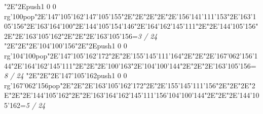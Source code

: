 \null\vfill\enskip\enskip\enskip\ipa\char"2E\enskip\enskip\enskip\ipa\char"2E\pdfcolorstack\match push{1 0 0 rg}\ipa\char'100\pdfcolorstack\match pop{}\ipa\char"2E\ipa\char'147\ipa\char'105\ipa\char'162\bigskip\ipa\char'147\ipa\char'105\ipa\char'155\ipa\char"2E\enskip\enskip\enskip\ipa\char"2E\enskip\enskip\enskip\enskip\enskip\enskip\bigskip\enskip\enskip\ipa\char"2E\enskip\enskip\enskip\enskip\ipa\char"2E\enskip\ipa\char"2E\ipa\char'156\ipa\char'141\ipa\char'111\ipa\char'153\ipa\char"2E\ipa\char'163\ipa\char'105\ipa\char'156\ipa\char"2E\ipa\char'163\ipa\char'164\ipa\char'100\ipa\char"2E\ipa\char'144\ipa\char'105\ipa\char'154\ipa\char'146\bigskip\enskip\ipa\char"2E\ipa\char'164\ipa\char'162\ipa\char'145\ipa\char'111\ipa\char"2E\enskip\enskip\ipa\char"2E\ipa\char'144\ipa\char'105\ipa\char'156\ipa\char"2E\enskip\enskip\ipa\char"2E\enskip\enskip\enskip\enskip\enskip\enskip\bigskip\ipa\char'163\ipa\char'105\ipa\char'162\ipa\char"2E\enskip\enskip\ipa\char"2E\enskip\enskip\enskip\ipa\char"2E\ipa\char'163\ipa\char'105\ipa\char'156\bigskip\vfill\footline={\hfill\tenrm\it 3 / 24}\eject
\null\vfill\enskip\enskip\enskip\ipa\char"2E\enskip\enskip\enskip\ipa\char"2E\enskip\ipa\char"2E\ipa\char'104\ipa\char'100\ipa\char'156\bigskip\enskip\enskip\enskip\ipa\char"2E\enskip\enskip\enskip\ipa\char"2E\enskip\enskip\enskip\enskip\enskip\enskip\bigskip\pdfcolorstack\match push{1 0 0 rg}\ipa\char'104\ipa\char'100\pdfcolorstack\match pop{}\ipa\char"2E\ipa\char'147\ipa\char'105\ipa\char'162\ipa\char'172\ipa\char"2E\enskip\ipa\char"2E\ipa\char'155\ipa\char'145\ipa\char'111\ipa\char'164\ipa\char"2E\enskip\enskip\enskip\ipa\char"2E\enskip\enskip\enskip\ipa\char"2E\ipa\char'167\ipa\char'062\ipa\char'156\ipa\char'144\bigskip\enskip\ipa\char"2E\ipa\char'164\ipa\char'162\ipa\char'145\ipa\char'111\ipa\char"2E\enskip\enskip\ipa\char"2E\enskip\enskip\enskip\ipa\char"2E\ipa\char'100\ipa\char'163\ipa\char"2E\enskip\enskip\enskip\enskip\enskip\enskip\bigskip\ipa\char'104\ipa\char'100\ipa\char'144\ipa\char"2E\enskip\enskip\ipa\char"2E\enskip\enskip\enskip\ipa\char"2E\ipa\char'163\ipa\char'105\ipa\char'156\bigskip\vfill\footline={\hfill\tenrm\it 8 / 24}\eject
\null\vfill\enskip\enskip\enskip\ipa\char"2E\enskip\enskip\enskip\ipa\char"2E\enskip\ipa\char"2E\ipa\char'147\ipa\char'105\ipa\char'162\bigskip\pdfcolorstack\match push{1 0 0 rg}\ipa\char'167\ipa\char'062\ipa\char'156\pdfcolorstack\match pop{}\ipa\char"2E\enskip\enskip\enskip\ipa\char"2E\enskip\enskip\enskip\enskip\enskip\enskip\bigskip\enskip\enskip\ipa\char"2E\ipa\char'163\ipa\char'105\ipa\char'162\ipa\char'172\ipa\char"2E\enskip\ipa\char"2E\ipa\char'155\ipa\char'145\ipa\char'111\ipa\char'156\ipa\char"2E\enskip\enskip\enskip\ipa\char"2E\enskip\enskip\enskip\ipa\char"2E\enskip\enskip\enskip\enskip\bigskip\enskip\ipa\char"2E\enskip\enskip\enskip\enskip\ipa\char"2E\enskip\enskip\ipa\char"2E\ipa\char'144\ipa\char'105\ipa\char'162\ipa\char"2E\enskip\enskip\ipa\char"2E\ipa\char'163\ipa\char'164\ipa\char'162\ipa\char'145\ipa\char'111\ipa\char'156\bigskip\ipa\char'104\ipa\char'100\ipa\char'144\ipa\char"2E\enskip\enskip\ipa\char"2E\enskip\enskip\enskip\ipa\char"2E\ipa\char'144\ipa\char'105\ipa\char'162\bigskip\vfill\footline={\hfill\tenrm\it 5 / 24}\eject
